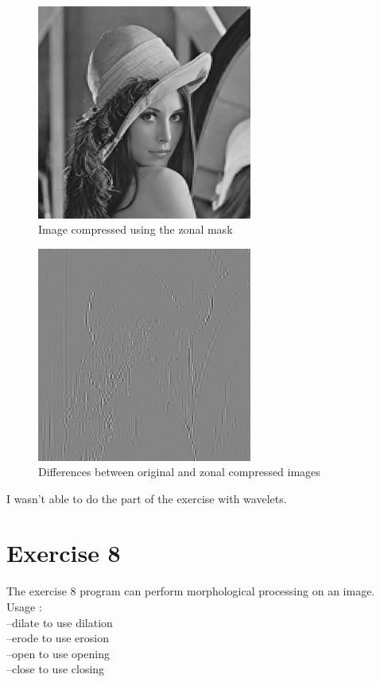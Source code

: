 \documentclass[10pt]{article}
\begin{document}
\begin{figure}[!ht]
	\centering
	\includegraphics[height=200pt]{./ex7/threshold.jpg}
	\caption{Image compressed using the zonal mask}
\end{figure}
\begin{figure}[!ht]
	\centering
	\includegraphics[height=200pt]{./ex7/thresholddiff.jpg}
	\caption{Differences between original and zonal compressed images}
\end{figure}

\clearpage

I wasn't able to do the part of the exercise with wavelets.

\section{Exercise 8}
The exercise 8 program can perform morphological processing on an image.\\

Usage :\\ 
--dilate to use dilation\\
--erode to use erosion\\
--open to use opening\\
--close to use closing\\
\end{document}
